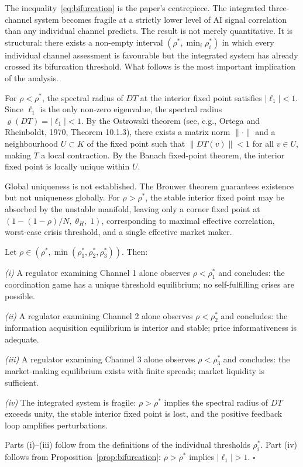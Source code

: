 The inequality~\eqref{eq:bifurcation} is the paper's centrepiece. The integrated three-channel system becomes fragile at a strictly lower level of AI signal correlation than any individual channel predicts. The result is not merely quantitative. It is structural: there exists a non-empty interval $(\rho^*, \min_i \rho_i^*)$ in which every individual channel assessment is favourable but the integrated system has already crossed its bifurcation threshold. What follows is the most important implication of the analysis.

\begin{proposition}\label{prop:local-uniqueness}
  For $\rho < \rho^*$, the spectral radius of $DT$ at the interior fixed point satisfies $|\ell_1| < 1$. Since $\ell_1$ is the only non-zero eigenvalue, the spectral radius $\varrho(DT) = |\ell_1| < 1$. By the Ostrowski theorem (see, e.g., Ortega and Rheinboldt, 1970, Theorem 10.1.3), there exists a matrix norm $\|\cdot\|$ and a neighbourhood $U \subset K$ of the fixed point such that $\|DT(v)\| < 1$ for all $v \in U$, making $T$ a local contraction. By the Banach fixed-point theorem, the interior fixed point is locally unique within $U$.

   Global uniqueness is not established. The Brouwer theorem guarantees existence but not uniqueness globally. For $\rho > \rho^*$, the stable interior fixed point may be absorbed by the unstable manifold, leaving only a corner fixed point at $(1-(1-\rho)/N,\; \theta_H,\; 1)$, corresponding to maximal effective correlation, worst-case crisis threshold, and a single effective market maker.
\end{proposition}

\begin{corollary}\label{cor:safety-illusion}
  Let $\rho \in (\rho^*, \min(\rho_1^*, \rho_2^*, \rho_3^*))$. Then:

  \emph{(i)} A regulator examining Channel 1 alone observes $\rho < \rho_1^*$ and concludes: the coordination game has a unique threshold equilibrium; no self-fulfilling crises are possible.

  \emph{(ii)} A regulator examining Channel 2 alone observes $\rho < \rho_2^*$ and concludes: the information acquisition equilibrium is interior and stable; price informativeness is adequate.

  \emph{(iii)} A regulator examining Channel 3 alone observes $\rho < \rho_3^*$ and concludes: the market-making equilibrium exists with finite spreads; market liquidity is sufficient.

  \emph{(iv)} The integrated system is fragile: $\rho > \rho^*$ implies the spectral radius of $DT$ exceeds unity, the stable interior fixed point is lost, and the positive feedback loop amplifies perturbations.

   Parts (i)--(iii) follow from the definitions of the individual thresholds $\rho_i^*$. Part (iv) follows from Proposition~\ref{prop:bifurcation}: $\rho > \rho^*$ implies $|\ell_1| > 1$. $\square$
\end{corollary}

